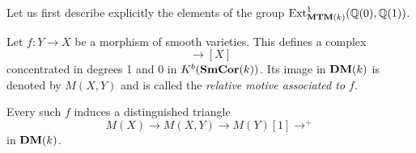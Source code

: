 Let us first describe explicitly the elements of the group
$\mathrm{Ext}^1_{\mathbf{MTM}(k)}(\mathbb{Q}(0), \mathbb{Q}(1))$.
\begin{defn}
  Let $f : Y \to X$ be a morphism of smooth varieties. This defines a
  complex 
  \begin{equation*}
    [Y]\to[X]
  \end{equation*}
  concentrated in degrees 1 and 0 in $K^{b}(\mathbf{SmCor}(k))$. Its image in
  $\mathbf{DM}(k)$ is denoted by $M(X,Y)$ and is called the \emph{relative
    motive associated to $f$}.
\end{defn}

\begin{rem}
  Every such $f$ induces a distinguished triangle
  \begin{equation*}
    M(X)\to M(X,Y)\to M(Y)[1]\to^{+}%
  \end{equation*}
  in $\mathbf{DM}(k)$.
\end{rem}
